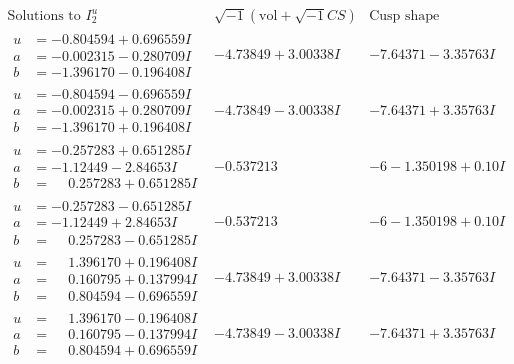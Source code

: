 \documentclass[1p]{elsarticle_modified}
\theoremstyle{definition}
\newcommand{\I}{\sqrt{-1}}
\begin{document}
$$\begin{array}{c|c|c}  
\text{Solutions to }I^u_{2}& \I (\text{vol} + \sqrt{-1}CS) & \text{Cusp shape}\\
 \hline 
\begin{aligned}
u &= -0.804594 + 0.696559 I \\
a &= -0.002315 - 0.280709 I \\
b &= -1.396170 - 0.196408 I\end{aligned}
 & -4.73849 + 3.00338 I & -7.64371 - 3.35763 I \\ \hline\begin{aligned}
u &= -0.804594 - 0.696559 I \\
a &= -0.002315 + 0.280709 I \\
b &= -1.396170 + 0.196408 I\end{aligned}
 & -4.73849 - 3.00338 I & -7.64371 + 3.35763 I \\ \hline\begin{aligned}
u &= -0.257283 + 0.651285 I \\
a &= -1.12449 - 2.84653 I \\
b &= \phantom{-}0.257283 + 0.651285 I\end{aligned}
 & -0.537213\phantom{ +0.000000I} &                  -6
-1.350198 + 0. 10   I\phantom{ +0.000000I} \\ \hline\begin{aligned}
u &= -0.257283 - 0.651285 I \\
a &= -1.12449 + 2.84653 I \\
b &= \phantom{-}0.257283 - 0.651285 I\end{aligned}
 & -0.537213\phantom{ +0.000000I} &                  -6
-1.350198 + 0. 10   I\phantom{ +0.000000I} \\ \hline\begin{aligned}
u &= \phantom{-}1.396170 + 0.196408 I \\
a &= \phantom{-}0.160795 + 0.137994 I \\
b &= \phantom{-}0.804594 - 0.696559 I\end{aligned}
 & -4.73849 + 3.00338 I & -7.64371 - 3.35763 I \\ \hline\begin{aligned}
u &= \phantom{-}1.396170 - 0.196408 I \\
a &= \phantom{-}0.160795 - 0.137994 I \\
b &= \phantom{-}0.804594 + 0.696559 I\end{aligned}
 & -4.73849 - 3.00338 I & -7.64371 + 3.35763 I \\ \hline\begin{aligned}

\end{aligned}
\end{array}$$
\end{document}
